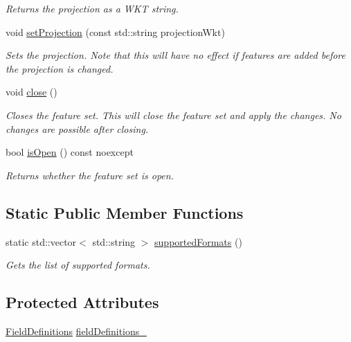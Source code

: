 \begin{DoxyCompactItemize}
\begin{DoxyCompactList}\small\item\em Returns the projection as a W\+KT string. \end{DoxyCompactList}\item 
void \hyperlink{group___vector_module_gab665679d2cea8d9b0c324fd52410e181}{set\+Projection} (const std\+::string projection\+Wkt)
\begin{DoxyCompactList}\small\item\em Sets the projection. Note that this will have no effect if features are added before the projection is changed. \end{DoxyCompactList}\item 
void \hyperlink{group___vector_module_gabd53e45c4396d9a6798453b82fb396ac}{close} ()
\begin{DoxyCompactList}\small\item\em Closes the feature set. This will close the feature set and apply the changes. No changes are possible after closing. \end{DoxyCompactList}\item 
bool \hyperlink{group___vector_module_ga452851f214ba915b11acdac63fe3d6ba}{is\+Open} () const noexcept
\begin{DoxyCompactList}\small\item\em Returns whether the feature set is open. \end{DoxyCompactList}\end{DoxyCompactItemize}
\subsection*{Static Public Member Functions}
\begin{DoxyCompactItemize}
\item 
static std\+::vector$<$ std\+::string $>$ \hyperlink{classdg_1_1deepcore_1_1vector_1_1_feature_set_a157fb6015d620a272b8c8395daea2c03}{supported\+Formats} ()
\begin{DoxyCompactList}\small\item\em Gets the list of supported formats. \end{DoxyCompactList}\end{DoxyCompactItemize}
\subsection*{Protected Attributes}
\begin{DoxyCompactItemize}
\item 
\hyperlink{namespacedg_1_1deepcore_1_1vector_a89a39c2fa657ff95f116cfed4a951386}{Field\+Definitions} \hyperlink{classdg_1_1deepcore_1_1vector_1_1_feature_set_a0fdfbe8046808f547dd24594b45be9cf}{field\+Definitions\+\_\+}
\end{DoxyCompactItemize}


